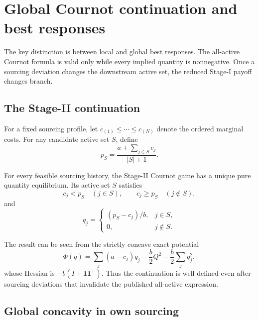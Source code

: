 \section{Global Cournot continuation and best responses}
\label{sec:bestresponses}

The key distinction is between local and global best responses.  The all-active Cournot formula is valid only while every implied quantity is nonnegative.  Once a sourcing deviation changes the downstream active set, the reduced Stage-I payoff changes branch.

\subsection{The Stage-II continuation}

For a fixed sourcing profile, let \(c_{(1)}\le\cdots\le c_{(N)}\) denote the ordered marginal costs.  For any candidate active set \(S\), define
\begin{equation}
p_S=\frac{a+\sum_{j\in S}c_j}{|S|+1}.
\label{eq:pS}
\end{equation}

\begin{lemma}
\label{lem:cournot-continuation}
For every feasible sourcing history, the Stage-II Cournot game has a unique pure quantity equilibrium.  Its active set \(S\) satisfies
\[
c_j<p_S\quad(j\in S),
\qquad
c_j\ge p_S\quad(j\notin S),
\]
and
\begin{equation}
q_j=
\begin{cases}
(p_S-c_j)/b,&j\in S,\\
0,&j\notin S.
\end{cases}
\label{eq:active-set-q}
\end{equation}
\end{lemma}

The result can be seen from the strictly concave exact potential
\begin{equation}
\Phi(q)=
\sum_j(a-c_j)q_j
-\frac b2Q^2
-\frac b2\sum_jq_j^2,
\label{eq:potential}
\end{equation}
whose Hessian is \(-b(I+\mathbf 1\mathbf 1^\top)\).  Thus the continuation is well defined even after sourcing deviations that invalidate the published all-active expression.

\subsection{Global concavity in own sourcing}

